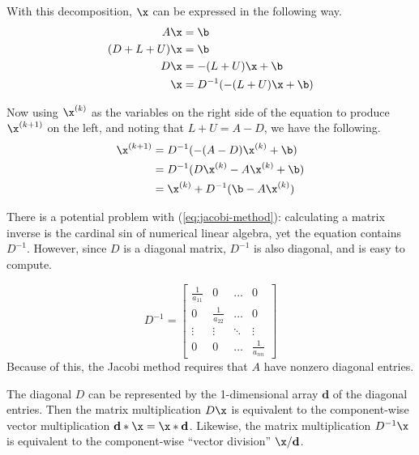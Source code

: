 With this decomposition, $\x$ can be expressed in the following way.
\begin{align*}
A\x &= \b\\
(D + L + U)\x &= \b\\
D\x &= -(L+U)\x + \b\\
\x &= D^{-1}(-(L+U)\x + \b)
\end{align*}

Now using $\x^{(k)}$ as the variables on the right side of the equation to produce $\x^{(k+1)}$ on the left, and noting that $L+U=A-D$, we have the following.
\begin{align}
\nonumber \x^{(k+1)} &= D^{-1}(-(A-D)\x^{(k)} + \b) \\
\nonumber &= D^{-1}(D\x^{(k)} - A\x^{(k)}  + \b)\\
&= \x^{(k)} + D^{-1}(\b - A\x^{(k)})
\label{eq:jacobi-method}
\end{align}

There is a potential problem with (\ref{eq:jacobi-method}): calculating a matrix inverse is the cardinal sin of numerical linear algebra, yet the equation contains $D^{-1}$.
However, since $D$ is a diagonal matrix, $D^{-1}$ is also diagonal, and is easy to compute.

\[
D^{-1} =
\left[\begin{array}{cccc}
    \frac{1}{a_{11}} & 0                & \ldots & 0      \\
    0                & \frac{1}{a_{22}} & \ldots & 0      \\
    \vdots           & \vdots           & \ddots & \vdots \\
    0                & 0                & \ldots & \frac{1}{a_{nn}}
\end{array}\right]
\]
Because of this, the Jacobi method requires that $A$ have nonzero diagonal entries.

The diagonal $D$ can be represented by the 1-dimensional array $\mathbf{d}$ of the diagonal entries. %
Then the matrix multiplication $D\x$ is equivalent to the component-wise vector multiplication $\mathbf{d}*\x = \x*\mathbf{d}$.
Likewise, the matrix multiplication $D^{-1}\x$ is equivalent to the component-wise ``vector division'' $\x/\mathbf{d}$.

